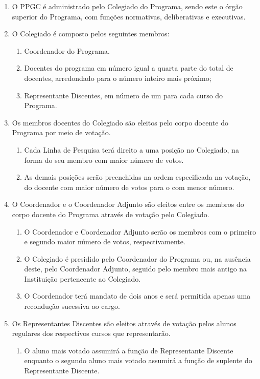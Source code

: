 \documentclass{article}
\newcommand{\singleitem}{\item[Parágrafo Único.]}
\begin{document}
\begin{enumerate}

	\item O PPGC é administrado pelo Colegiado do Programa, sendo este o órgão superior do Programa, com funções normativas, deliberativas e executivas.	%

	\item O Colegiado é composto pelos seguintes membros:
	\begin{enumerate}[label=\Roman*]
		\item Coordenador do Programa.
		\item Docentes do programa em número igual a quarta parte do total de docentes, arredondado para o número inteiro mais próximo;
		\item Representante Discentes, em número de um para cada curso do Programa.
	\end{enumerate}

	\item Os membros docentes do Colegiado são eleitos pelo corpo docente do Programa por meio de votação.
	\begin{enumerate}
		\item Cada Linha de Pesquisa terá direito a uma posição no Colegiado, na forma do seu membro com maior número de votos.
		\item As demais posições serão preenchidas na ordem especificada na votação, do docente com maior número de votos para o com menor número.
	\end{enumerate}

	\item O Coordenador e o Coordenador Adjunto são eleitos entre os membros do corpo docente do Programa através de votação pelo Colegiado. 
	\begin{enumerate}
		\item O Coordenador e Coordenador Adjunto serão os membros com o primeiro e segundo maior número de votos, respectivamente.
		\item O Colegiado é presidido pelo Coordenador do Programa ou, na ausência deste, pelo Coordenador Adjunto, seguido pelo membro mais antigo na Instituição pertencente ao Colegiado.
		\item O Coordenador terá mandato de dois anos e será permitida apenas uma recondução sucessiva ao cargo.
	\end{enumerate}

	\item Os Representantes Discentes são eleitos através de votação pelos alunos regulares dos respectivos cursos que representarão.
	\begin{enumerate}
		\singleitem O aluno mais votado assumirá a função de Representante Discente enquanto o segundo aluno mais votado assumirá a função de suplente do Representante Discente.
	\end{enumerate}	

\end{enumerate}
\end{document}
